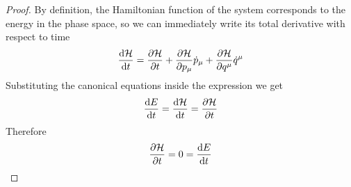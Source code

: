 \documentclass[../admech.tex]{subfiles}
\begin{document}
\begin{proof}
	By definition, the Hamiltonian function of the system corresponds to the energy in the phase space, so we can immediately write its total derivative with respect to time
	\begin{equation}
		\dv{\mathcal{H}}{t}=\pdv{\mathcal{H}}{t}+\pdv{\mathcal{H}}{p_\mu}\dot{p}_\mu+\pdv{\mathcal{H}}{q^\mu}\dot{q}^\mu
		\label{eq:derham}
	\end{equation}
	Substituting the canonical equations inside the expression we get
	\begin{equation*}
		\dv{E}{t}=\dv{\mathcal{H}}{t}=\pdv{\mathcal{H}}{t}
	\end{equation*}
	Therefore
	\begin{equation*}
		\pdv{\mathcal{H}}{t}=0=\dv{E}{t}
	\end{equation*}
\end{proof}
\end{document}
